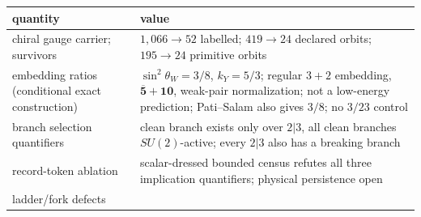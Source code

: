 \begin{longtable}[]{@{}ll@{}}
\toprule
\begin{minipage}[b]{0.47\columnwidth}\raggedright
quantity\strut
\end{minipage} & \begin{minipage}[b]{0.47\columnwidth}\raggedright
value\strut
\end{minipage}\tabularnewline
\midrule
\endhead
\begin{minipage}[t]{0.47\columnwidth}\raggedright
chiral gauge carrier; survivors\strut
\end{minipage} & \begin{minipage}[t]{0.47\columnwidth}\raggedright
\(1{,}066\to52\) labelled; \(419\to24\) declared orbits; \(195\to24\) primitive orbits\strut
\end{minipage}\tabularnewline
\begin{minipage}[t]{0.47\columnwidth}\raggedright
embedding ratios (conditional exact construction)\strut
\end{minipage} & \begin{minipage}[t]{0.47\columnwidth}\raggedright
\(\sin^2\theta_W = 3/8\), \(k_Y = 5/3\); regular \(3+2\) embedding,
\(\overline{\mathbf5}+\mathbf{10}\), weak-pair normalization; not a low-energy prediction; Pati--Salam also gives
\(3/8\); no \(3/23\) control\strut
\end{minipage}\tabularnewline
\begin{minipage}[t]{0.47\columnwidth}\raggedright
branch selection quantifiers\strut
\end{minipage} & \begin{minipage}[t]{0.47\columnwidth}\raggedright
clean branch exists only over \(2|3\), all clean branches \(SU(2)\)-active; every \(2|3\) also has a breaking branch\strut
\end{minipage}\tabularnewline
\begin{minipage}[t]{0.47\columnwidth}\raggedright
record-token ablation\strut
\end{minipage} & \begin{minipage}[t]{0.47\columnwidth}\raggedright
scalar-dressed bounded census refutes all three implication quantifiers; physical persistence open\strut
\end{minipage}\tabularnewline
\begin{minipage}[t]{0.47\columnwidth}\raggedright
ladder/fork defects\strut
\end{minipage} & \begin{minipage}[t]{0.47\columnwidth}\raggedright

\end{minipage}
\end{longtable}
